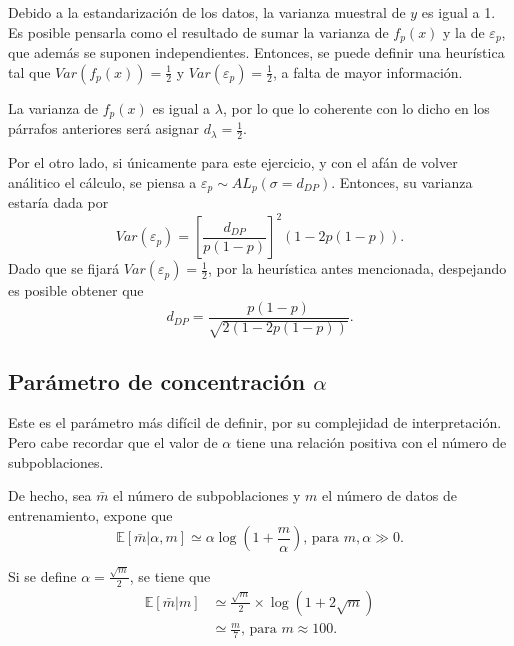 Debido a la estandarizaci\'on de los datos, la varianza muestral de $y$ es igual a 1. Es posible pensarla como el resultado de sumar la varianza de $f_p(x)$ y la de $\varepsilon_p$, que adem\'as se suponen independientes. Entonces, se puede definir una heur\'istica tal que $Var(f_p(x)) = \frac{1}{2}$ y $Var(\varepsilon_p) = \frac{1}{2}$, a falta de mayor informaci\'on.

La varianza de $f_p(x)$ es igual a $\lambda$, por lo que lo coherente con lo dicho en los p\'arrafos anteriores ser\'a asignar $d_\lambda = \frac{1}{2}$. 

Por el otro lado, si \'unicamente para este ejercicio, y con el af\'an de volver an\'alitico el c\'alculo, se piensa a $\varepsilon_p \sim AL_p(\sigma = d_{DP})$. Entonces, su varianza estar\'ia dada por
\begin{equation*}
    Var(\varepsilon_p) = 
    \left[\frac{d_{DP}}{p(1-p)}\right]^2
    (1-2p(1-p)).
\end{equation*}
Dado que se fijar\'a $Var(\varepsilon_p) = \frac{1}{2}$, por la heur\'istica antes mencionada, despejando es posible obtener que
\begin{equation*}
    d_{DP} = \frac{p(1-p)}{\sqrt{2(1-2p(1-p))}}.
\end{equation*}

\subsection{Par\'ametro de concentraci\'on $\alpha$}

Este es el par\'ametro m\'as dif\'icil de definir, por su complejidad de interpretaci\'on. Pero cabe recordar que el valor de $\alpha$ tiene una relaci\'on positiva con el n\'umero de subpoblaciones. 

De hecho, sea $\bar{m}$ el n\'umero de subpoblaciones y $m$ el n\'umero de datos de entrenamiento, \cite{Yee_DirProc} expone que
\begin{equation*}
    \mathbb{E}[\bar{m}|\alpha, m] 
    \simeq 
    \alpha
    \log 
    \left(
        1 + \frac{m}{\alpha}
    \right)
    \text{, para } m, \alpha \gg 0.
\end{equation*}

Si se define $\alpha = \frac{\sqrt{m}}{2}$, se tiene que
\begin{equation*}
\begin{aligned}
    \mathbb{E}[\bar{m}|m] 
    &\simeq 
    \frac{\sqrt{m}}{2}
    \times
    \log 
    \left(
        1 + 2\sqrt{m}
    \right)\\
    &\simeq
    \frac{m}{7} 
    \text{, para } m \approx 100.
\end{aligned}
\end{equation*}

